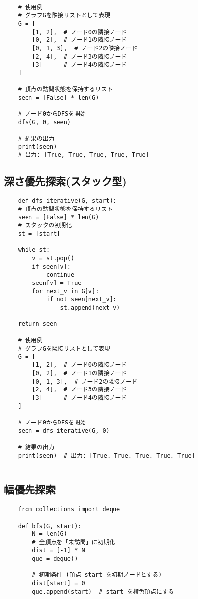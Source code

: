 \documentclass[a4paper, landscape, 9pt]{jarticle} %
\begin{document}
\begin{multicols*}{3}
\begin{lstlisting}
    
    # 使用例
    # グラフGを隣接リストとして表現
    G = [
        [1, 2],  # ノード0の隣接ノード
        [0, 2],  # ノード1の隣接ノード
        [0, 1, 3],  # ノード2の隣接ノード
        [2, 4],  # ノード3の隣接ノード
        [3]      # ノード4の隣接ノード
    ]
    
    # 頂点の訪問状態を保持するリスト
    seen = [False] * len(G)
    
    # ノード0からDFSを開始
    dfs(G, 0, seen)
    
    # 結果の出力
    print(seen)  
    # 出力: [True, True, True, True, True]
    \end{lstlisting}

    \subsection{深さ優先探索(スタック型)}
    \begin{lstlisting}
    def dfs_iterative(G, start):
    # 頂点の訪問状態を保持するリスト
    seen = [False] * len(G)
    # スタックの初期化
    st = [start]
    
    while st:
        v = st.pop()
        if seen[v]:
            continue
        seen[v] = True
        for next_v in G[v]:
            if not seen[next_v]:
                st.append(next_v)
    
    return seen
    
    # 使用例
    # グラフGを隣接リストとして表現
    G = [
        [1, 2],  # ノード0の隣接ノード
        [0, 2],  # ノード1の隣接ノード
        [0, 1, 3],  # ノード2の隣接ノード
        [2, 4],  # ノード3の隣接ノード
        [3]      # ノード4の隣接ノード
    ]
    
    # ノード0からDFSを開始
    seen = dfs_iterative(G, 0)
    
    # 結果の出力
    print(seen)  # 出力: [True, True, True, True, True]
    
    \end{lstlisting}

    \subsection{幅優先探索}
    \begin{lstlisting}
    from collections import deque

    def bfs(G, start):
        N = len(G)
        # 全頂点を「未訪問」に初期化
        dist = [-1] * N
        que = deque()
    
        # 初期条件 (頂点 start を初期ノードとする)
        dist[start] = 0
        que.append(start)  # start を橙色頂点にする
    

\end{lstlisting}
\end{multicols*}
\end{document}
